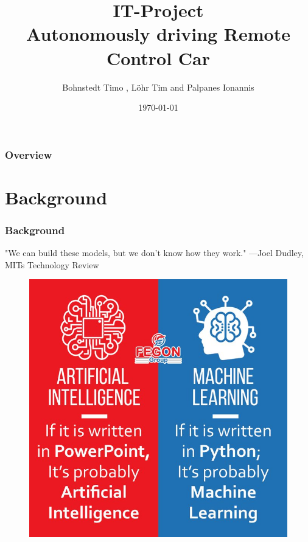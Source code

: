 \documentclass{beamer}
\title{IT-Project \\ Autonomously driving Remote Control Car} %
\author{Bohnstedt Timo ,
      L\"ohr Tim and Palpanes Ionannis\\%
      }
\institute[Computer Science| Prof. Dr. Florian Gallwitz] %
{
Georg Simon Ohm University of Applied Science\\ %
\medskip
\textit{IT Project Presentation} 
}
\date{\today} %
\begin{document}
\begin{frame}
\titlepage %
\end{frame}
\begin{frame}
\frametitle{Overview} %
\tableofcontents %
\end{frame}
%
\section{Background}
%
\begin{frame}
\frametitle{Background}
\begin{center}
"We can build these models, but we don't know how they work."  \textup{---Joel Dudley}, MITs Technology Review
\end{center}
\begin{figure}
\includegraphics[width=0.4\linewidth]{photo/aivsml}
\end{figure}
\end{frame}
%
\end{document}
